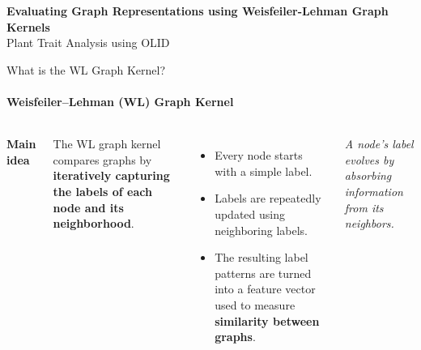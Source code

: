 \documentclass[aspectratio=169, 11pt]{beamer}
\begin{document}
\begin{frame}
    \titlepage
    \begin{center}
        \textbf{Evaluating Graph Representations using Weisfeiler-Lehman Graph Kernels} \\
        \vspace{0.2cm}
        Plant Trait Analysis using OLID
    \end{center}
\end{frame}

\begin{frame}{What is the WL Graph Kernel?}
    \framesubtitle{Weisfeiler--Lehman (WL) Graph Kernel}
    \begin{columns}[c]
        \textbf{Main idea}
        \vspace{0.15cm}

        The WL graph kernel compares graphs by \textbf{iteratively capturing the
        labels of each node and its neighborhood}.

        \vspace{0.3cm}
        \begin{itemize}
            \item Every node starts with a simple label.
            \item Labels are repeatedly updated using neighboring labels.
            \item The resulting label patterns are turned into a
            feature vector used to measure \textbf{similarity between graphs}.
        \end{itemize}

        \centering

        \vspace{0.1cm}
        {\scriptsize\itshape A node's label evolves by absorbing
        information from its neighbors.}
    \end{columns}
\end{frame}
\end{document}
